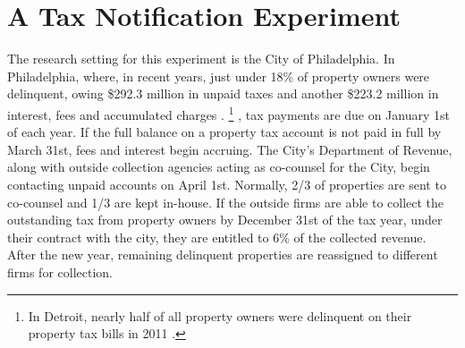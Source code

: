 \documentclass[12pt,titlepage]{article}
\begin{document}
\section{A Tax Notification Experiment}

The research setting for this experiment is the City of
Philadelphia. In Philadelphia, where, in recent years, just under
18\% of property owners were delinquent, owing 
\$292.3 million in unpaid taxes and another \$223.2 million in interest,
fees and accumulated charges \citep{pew}.
\footnote{
	In Detroit, nearly half of all property owners were delinquent
    on their property tax bills in 2011 \citep{macdonald}.
}
, tax payments are due on January 1st of each year. If the full balance on a
property tax account is not paid in full by March 31st, fees and interest
begin accruing. The City's Department of Revenue, along with outside
collection agencies acting as co-counsel for the City, begin contacting
unpaid accounts on April 1st. Normally, 2/3 of properties are sent to
co-counsel and 1/3 are kept in-house. If the outside firms are able to
collect the outstanding tax from property owners by December 31st of the
tax year, under their contract with the city, they are entitled to 6\% of
the collected revenue. After the new year, remaining delinquent properties
are reassigned to different firms for collection.



%
\end{document}
